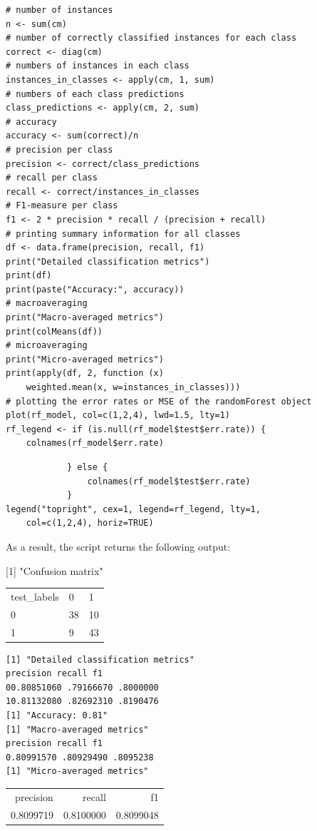\begin{verbatim}
# number of instances
n <- sum(cm)
# number of correctly classified instances for each class
correct <- diag(cm)
# numbers of instances in each class
instances_in_classes <- apply(cm, 1, sum)
# numbers of each class predictions
class_predictions <- apply(cm, 2, sum)
# accuracy
accuracy <- sum(correct)/n
# precision per class
precision <- correct/class_predictions
# recall per class
recall <- correct/instances_in_classes
# F1-measure per class
f1 <- 2 * precision * recall / (precision + recall)
# printing summary information for all classes
df <- data.frame(precision, recall, f1)
print("Detailed classification metrics")
print(df)
print(paste("Accuracy:", accuracy))
# macroaveraging
print("Macro-averaged metrics")
print(colMeans(df))
# microaveraging
print("Micro-averaged metrics")
print(apply(df, 2, function (x)
    weighted.mean(x, w=instances_in_classes)))
# plotting the error rates or MSE of the randomForest object
plot(rf_model, col=c(1,2,4), lwd=1.5, lty=1)
rf_legend <- if (is.null(rf_model$test$err.rate)) {
    colnames(rf_model$err.rate)
\end{verbatim}

\begin{verbatim}
            } else {
                colnames(rf_model$test$err.rate)
            }
legend("topright", cex=1, legend=rf_legend, lty=1,
    col=c(1,2,4), horiz=TRUE)
\end{verbatim}

As a result, the script returns the following output:

[1] "Confusion matrix"
\begin{flushleft}
\begin{tabular}{lll}
test\_labels & 0 & 1 \\
0 & 38 & 10 \\
1 & 9 & 43 \\
\end{tabular}
\end{flushleft}

\begin{verbatim}
[1] "Detailed classification metrics"
precision recall f1
00.80851060 .79166670 .8000000
10.81132080 .82692310 .8190476
[1] "Accuracy: 0.81"
[1] "Macro-averaged metrics"
precision recall f1
0.80991570 .80929490 .8095238
[1] "Micro-averaged metrics"
\end{verbatim}

\begin{flushleft}
\begin{tabular}{rrr}
precision & recall & f1 \\
0.8099719 & 0.8100000 & 0.8099048 \\
\end{tabular}
\end{flushleft}

